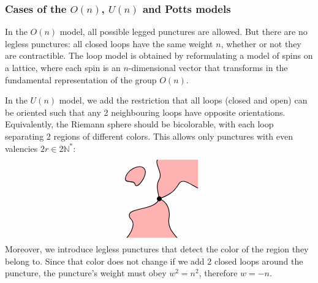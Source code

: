 \documentclass[12pt, a4paper]{article}
\theoremstyle{break}
\begin{document}
\subsubsection{Cases of the $O(n)$, $U(n)$ and Potts models}\label{sec:coup}

In the $O(n)$ model, all possible legged punctures are allowed. But there are no legless punctures: all closed loops have the same weight $n$, whether or not they are contractible. The loop model is obtained by reformulating a model of spins on a lattice, where each spin is an $n$-dimensional vector that transforms in the fundamental representation of the group $O(n)$. 

In the $U(n)$ model, we add the restriction that all loops (closed and open) can be oriented such that any 2 neighbouring loops have opposite orientations. Equivalently, the Riemann sphere should be bicolorable, with each loop separating 2 regions of different colors. This allows only punctures with even valencies $2r\in 2\mathbb{N}^*$:
\begin{align}
 \begin{tikzpicture}[baseline=(current  bounding  box.center), scale = .4]
 \clip (-4, -4) rectangle (4, 4);
  \filldraw[thick, fill = red!30] (0, 0) to [out = 100, in = -120] (0, 2) to [out = 60, in = -150] (0, 4.2) -- (4.2, 4.2) -- (4.2, 1) to [out = 160, in = 60] (2, 1.5) to [out = -120, in = 20] (0, 0);
  \filldraw[thick, fill = red!30] (0, 0) to [out = -20, in = 80] (1, -2) to [out = -100, in = 130] (2, -4.2) -- (-3.5, -4.2) to [out = 50, in = -40] (-3, -2) to [out = 120, in = -110] (0, 0);
  \filldraw[thick, fill = red!30] (-3.5, 2) to [out = 90, in = 120] (-1.5, 3) to [out = -60, in = -80] (-2.5, 1.5) to [out = 100, in = -90] (-3.5, 2);
   \draw (0, 0) node[fill, circle, minimum size = 2mm, inner sep = 0]{};
 \end{tikzpicture}
\end{align}
Moreover, we introduce legless punctures that detect the color of the region they belong to. Since that color does not change if we add 2 closed loops around the puncture, the puncture's weight must obey $w^2=n^2$, therefore $w=-n$. 
\end{document}

